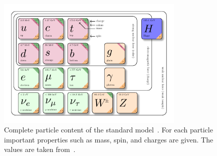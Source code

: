\begin{figure}[tbp]
 \centering
 \includegraphics[width=0.8\textwidth]{figures/general/SM}
 \caption{Complete particle content of the standard model~\cite{SMPlot}. For each particle important properties such as mass, spin, and charges are given. The values are taken from~\cite{PDG}.}
 \label{fig:SM}
 
\end{figure}


